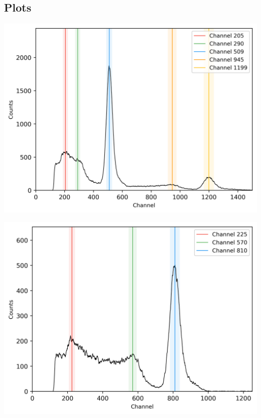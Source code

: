 \subsection{Plots}
%
\begin{center}
    \begin{adjustbox}{max width=\linewidth, keepaspectratio}
        \includegraphics[]{png/22Na}
    \end{adjustbox}
    \label{fig:}
\end{center}
%
\begin{center}
    \begin{adjustbox}{max width=\linewidth, keepaspectratio}
        \includegraphics[]{png/54Mn}
    \end{adjustbox}
    \label{fig:}
\end{center}
